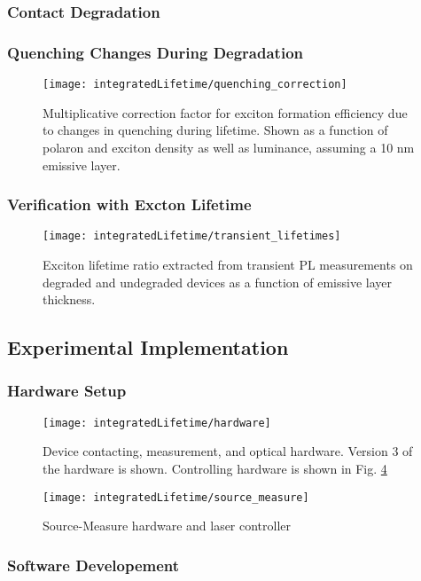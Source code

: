 \documentclass[../thesis.tex]{subfiles}
\begin{document}
\subsubsection{Contact Degradation}
\subsubsection{Quenching Changes During Degradation}
\begin{figure}[ht]
\centering
\texttt{[image: integratedLifetime/quenching\_correction]}
\caption{Multiplicative correction factor for exciton formation efficiency due to changes in quenching during lifetime.  Shown as a function of polaron and exciton density as well as luminance, assuming a 10 nm emissive layer.}
\label{fig:quenching_correction}
\end{figure}
\subsubsection{Verification with Excton Lifetime}
\begin{figure}[ht]
\centering
\texttt{[image: integratedLifetime/transient\_lifetimes]}
\caption{Exciton lifetime ratio extracted from transient PL measurements on degraded and undegraded devices as a function of emissive layer thickness.}
\label{fig:transient_lifetimes}
\end{figure}

\subsection{Experimental Implementation}
\subsubsection{Hardware Setup}
\begin{figure}[ht]
\centering
\texttt{[image: integratedLifetime/hardware]}
\caption{Device contacting, measurement, and optical hardware.  Version 3 of the hardware is shown.  Controlling hardware is shown in Fig. \ref{fig:source_measure}}
\label{fig:hardware}
\end{figure}

\begin{figure}[ht]
\centering
\texttt{[image: integratedLifetime/source\_measure]}
\caption{Source-Measure hardware and laser controller}
\label{fig:source_measure}
\end{figure}

\subsubsection{Software Developement}
\end{document}
